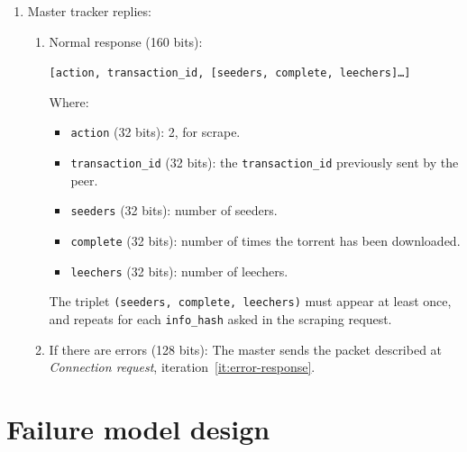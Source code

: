\documentclass[twoside,a4paper,10pt]{article}
\begin{document}
\begin{itemize}
\begin{itemize}
\begin{enumerate}
    \item Master tracker replies:

      \begin{enumerate}
      \item Normal response (160 bits):

        \texttt{[action, transaction\_id, [seeders, complete, leechers]\ldots]}

        Where:
        \begin{itemize}
        \item \texttt{action} (32 bits): 2, for scrape.
        \item \texttt{transaction\_id} (32 bits): the \texttt{transaction\_id}
          previously sent by the peer.
        \item \texttt{seeders} (32 bits): number of seeders.
        \item \texttt{complete} (32 bits): number of times the torrent has
          been downloaded.
        \item \texttt{leechers} (32 bits): number of leechers.
        \end{itemize}

        The triplet \texttt{(seeders, complete, leechers)} must appear at least
        once, and repeats for each \texttt{info\_hash} asked in the scraping
        request.
        
      \item If there are errors (128 bits): The master sends the packet
        described at \emph{Connection request},
        iteration~\ref{it:error-response}.
      \end{enumerate}
    \end{enumerate}
  \end{itemize}
\end{itemize}

\section{Failure model design}
\end{document}
